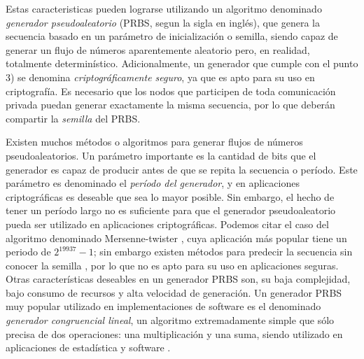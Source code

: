  Estas caracteristicas pueden lograrse utilizando un algoritmo denominado \textit{generador pseudoaleatorio} (PRBS, segun la sigla en inglés), que genera la secuencia basado en un parámetro de inicialización o semilla, siendo capaz de generar un flujo de números aparentemente aleatorio pero, en realidad, totalmente determinístico. Adicionalmente, un generador que cumple con el punto 3) se denomina \textit{criptográficamente seguro}, ya que es apto para su uso en criptografía. Es necesario que los nodos que participen de toda comunicación privada puedan generar exactamente la misma secuencia, por lo que deberán compartir la \textit{semilla} del PRBS.

Existen muchos métodos o algoritmos para generar flujos de números pseudoaleatorios. Un parámetro importante es la cantidad de bits que el generador es capaz de producir antes de que se repita la secuencia o período. Este parámetro es denominado el \textit{período del generador}, y en aplicaciones criptográficas es deseable que sea lo mayor posible. Sin embargo, el hecho de tener un período largo no es suficiente para que el generador pseudoaleatorio pueda ser utilizado en aplicaciones criptográficas. Podemos citar el caso del algoritmo denominado Mersenne-twister \cite{matsumoto1998mersenne}, cuya aplicación más popular tiene un periodo de $2^{19937}-1$; sin embargo existen métodos para predecir la secuencia sin conocer la semilla \cite{argyros2012forgot}, por lo que no es apto para su uso en aplicaciones seguras.
Otras características deseables en un generador PRBS son, su baja complejidad, bajo consumo de recursos y alta velocidad de generación. Un generador PRBS muy popular utilizado en implementaciones de software es el denominado \textit{generador congruencial lineal}, un algoritmo extremadamente simple que sólo precisa de dos operaciones: una multiplicación y una suma, siendo utilizado en aplicaciones de estadística y software \cite{park1988random}.

